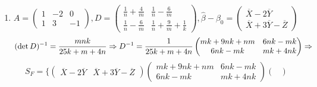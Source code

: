 {{\begin{enumerate}[label=\alph*]
\[    \begin{pmatrix}
    mk + nk + nm & nk - mk \\
    nk - mk & mk + nk 
    \end{pmatrix} \ra 
    \]
    \[S_{F} = 
    \{
    \begin{pmatrix}
    \overline{X} - \overline{Y} & \overline{X} + \overline{Y} - \overline{Z}
    \end{pmatrix}
    \begin{pmatrix}
    mk + nk + nm & nk - mk \\
    nk - mk & mk + nk 
    \end{pmatrix}
        \begin{pmatrix}
    \overline{X} - \overline{Y} \\ \overline{X} + \overline{Y} - \overline{Z}
    \end{pmatrix}
    \ge
    \] \[
    \frac{2(3k + n + m)}{m + n + k - 3}f_{1 - \alpha}(2, n + m + k - 3)
    \}
    \]
    \item $A = 
    \begin{pmatrix}
    1 & -2 & 0 \\
    1 & 3 & -1
    \end{pmatrix}, 
    D = 
    \begin{pmatrix}
    \frac{1}{n} + \frac{4}{m} & \frac{1}{n} - \frac{6}{m} \\
    \frac{1}{n} - \frac{6}{m} & \frac{1}{n} + \frac{9}{m} + \frac{1}{k}
    \end{pmatrix},
    \hat{\beta} - \beta_0 = 
    \begin{pmatrix}
    \overline{X} - 2\overline{Y} \\
    \overline{X} + 3\overline{Y} - \overline{Z}
    \end{pmatrix}
    $
    \[
    (\det D)^{-1} = \frac{mnk}{25k + m + 4n} \Rightarrow D^{-1} = \frac{1}{25k + m + 4n}
    \begin{pmatrix}
    mk + 9nk + nm & 6nk - mk \\
    6nk - mk & mk + 4nk 
    \end{pmatrix} \Rightarrow 
    \]
    \[S_{F} = 
    \{
    \begin{pmatrix}
    \overline{X} - 2\overline{Y} &
    \overline{X} + 3\overline{Y} - \overline{Z}
    \end{pmatrix}
    \begin{pmatrix}
    mk + 9nk + nm & 6nk - mk \\
    6nk - mk & mk + 4nk 
    \end{pmatrix}
    \begin{pmatrix}

\end{pmatrix}\]
\end{enumerate}}}
